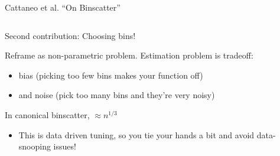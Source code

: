 \documentclass[notes,11pt, aspectratio=169]{beamer}
\newenvironment{wideitemize}{\itemize\addtolength{\itemsep}{10pt}}{\enditemize}
\begin{document}
\begin{frame}{Cattaneo et al. ``On Binscatter''}
  \begin{columns}[T] %
    \begin{column}{.7\textwidth}
      \begin{wideitemize}
      \item Second contribution: Choosing bins!
      \item Reframe as non-parametric problem. Estimation problem is tradeoff:
        \begin{itemize}
        \item  bias (picking too few bins makes your function off)
        \item and noise (pick too many bins and they're very noisy)
        \end{itemize}
      \item In canonical binscatter, $\approx n^{1/3}$
        \begin{itemize}
        \item This is data driven tuning, so you tie your hands a bit and
          avoid data-snooping issues!
        \end{itemize}
  \end{wideitemize}
  \end{column}%
  \hfill%
  \begin{column}{.5\textwidth}
  \end{column}
\end{columns}
\end{frame}
\end{document}

